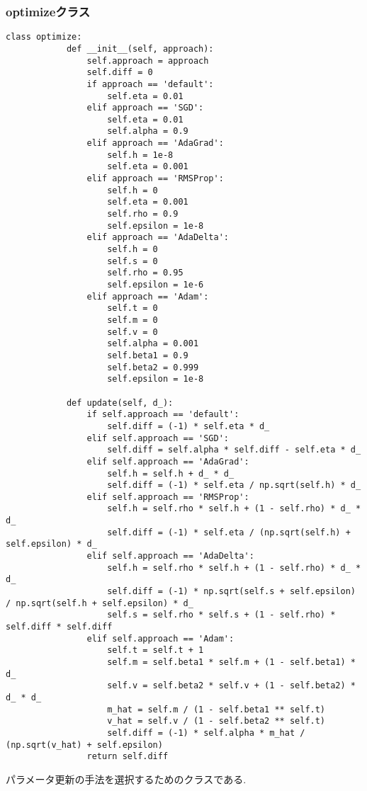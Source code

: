 \documentclass[a4j, titlepage]{jarticle}
\begin{document}
    \subsubsection{optimizeクラス}
        \begin{lstlisting}[caption=パラメータ更新の手法選択,label=fuga]
        class optimize:
            def __init__(self, approach):
                self.approach = approach
                self.diff = 0
                if approach == 'default':
                    self.eta = 0.01
                elif approach == 'SGD':
                    self.eta = 0.01
                    self.alpha = 0.9
                elif approach == 'AdaGrad':
                    self.h = 1e-8
                    self.eta = 0.001
                elif approach == 'RMSProp':
                    self.h = 0
                    self.eta = 0.001
                    self.rho = 0.9
                    self.epsilon = 1e-8
                elif approach == 'AdaDelta':
                    self.h = 0
                    self.s = 0
                    self.rho = 0.95
                    self.epsilon = 1e-6
                elif approach == 'Adam':
                    self.t = 0
                    self.m = 0
                    self.v = 0
                    self.alpha = 0.001
                    self.beta1 = 0.9
                    self.beta2 = 0.999
                    self.epsilon = 1e-8

            def update(self, d_):
                if self.approach == 'default':
                    self.diff = (-1) * self.eta * d_
                elif self.approach == 'SGD':
                    self.diff = self.alpha * self.diff - self.eta * d_
                elif self.approach == 'AdaGrad':
                    self.h = self.h + d_ * d_
                    self.diff = (-1) * self.eta / np.sqrt(self.h) * d_
                elif self.approach == 'RMSProp':
                    self.h = self.rho * self.h + (1 - self.rho) * d_ * d_
                    self.diff = (-1) * self.eta / (np.sqrt(self.h) + self.epsilon) * d_
                elif self.approach == 'AdaDelta':
                    self.h = self.rho * self.h + (1 - self.rho) * d_ * d_
                    self.diff = (-1) * np.sqrt(self.s + self.epsilon) / np.sqrt(self.h + self.epsilon) * d_
                    self.s = self.rho * self.s + (1 - self.rho) * self.diff * self.diff
                elif self.approach == 'Adam':
                    self.t = self.t + 1
                    self.m = self.beta1 * self.m + (1 - self.beta1) * d_
                    self.v = self.beta2 * self.v + (1 - self.beta2) * d_ * d_
                    m_hat = self.m / (1 - self.beta1 ** self.t)
                    v_hat = self.v / (1 - self.beta2 ** self.t)
                    self.diff = (-1) * self.alpha * m_hat / (np.sqrt(v_hat) + self.epsilon)
                return self.diff
        \end{lstlisting}
        パラメータ更新の手法を選択するためのクラスである.
\end{document}

